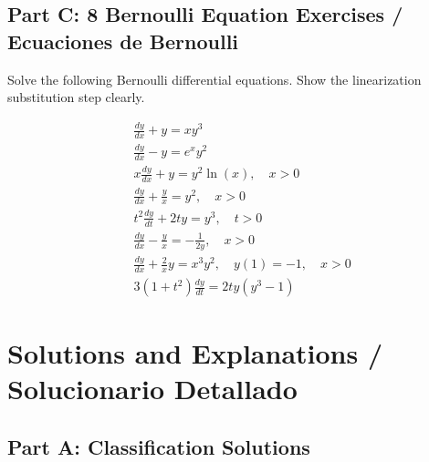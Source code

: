 \documentclass[11pt,letterpaper]{article}
\begin{document}
\subsection*{Part C: 8 Bernoulli Equation Exercises / Ecuaciones de Bernoulli}
Solve the following Bernoulli differential equations. Show the linearization substitution step clearly.

\begin{align}
    & \frac{dy}{dx} + y = xy^3 \label{eq:ber1} \\
    & \frac{dy}{dx} - y = e^x y^2 \label{eq:ber2} \\
    & x\frac{dy}{dx} + y = y^2 \ln(x), \quad x > 0 \label{eq:ber3} \\
    & \frac{dy}{dx} + \frac{y}{x} = y^2, \quad x > 0 \label{eq:ber4} \\
    & t^2 \frac{dy}{dt} + 2ty = y^3, \quad t > 0 \label{eq:ber5} \\
    & \frac{dy}{dx} - \frac{y}{x} = -\frac{1}{2y}, \quad x > 0 \label{eq:ber6} \\
    & \frac{dy}{dx} + \frac{2}{x}y = x^3 y^2, \quad y(1) = -1, \quad x > 0 \label{eq:ber7} \\
    & 3(1+t^2)\frac{dy}{dt} = 2ty(y^3 - 1) \label{eq:ber8}
\end{align}

\newpage
\section{Solutions and Explanations / Solucionario Detallado}

\subsection*{Part A: Classification Solutions}
\end{document}
